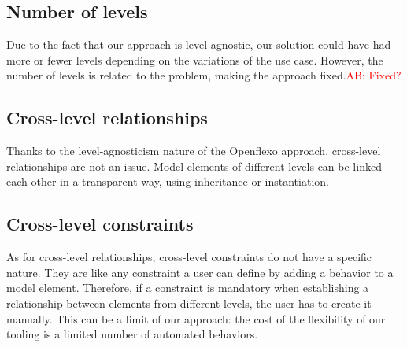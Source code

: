 
  \subsection{Number of levels}

  Due to the fact that our approach is level-agnostic, our solution could have had more
  or fewer levels depending on the variations of the use case. However, the number of levels is related
  to the problem, making the approach fixed.\textcolor{red}{AB: Fixed?}

  \subsection{Cross-level relationships}


  Thanks to the level-agnosticism nature of the Openflexo approach, cross-level
  relationships are not an issue. Model elements of different levels can be
  linked each other in a transparent way, using inheritance or instantiation.

  \subsection{Cross-level constraints}


  As for cross-level relationships, cross-level constraints do not have a
  specific nature. They are like any constraint a user can define by adding a
  behavior to a model element. Therefore, if a constraint is mandatory when
  establishing a relationship between elements from different levels, the user
  has to create it manually. This can be a limit of our approach: the cost of
  the flexibility of our tooling is a limited number of automated behaviors.



